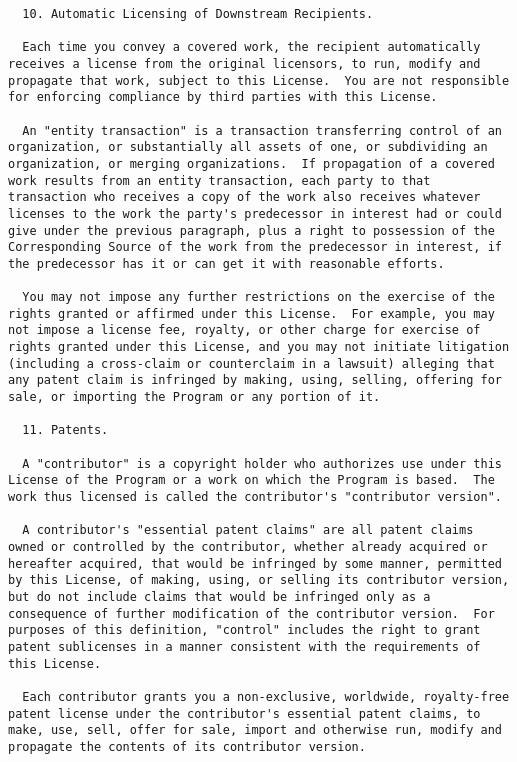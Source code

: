 \documentclass[11pt]{article}
\begin{document}
\begin{verbatim}
  10. Automatic Licensing of Downstream Recipients.

  Each time you convey a covered work, the recipient automatically
receives a license from the original licensors, to run, modify and
propagate that work, subject to this License.  You are not responsible
for enforcing compliance by third parties with this License.

  An "entity transaction" is a transaction transferring control of an
organization, or substantially all assets of one, or subdividing an
organization, or merging organizations.  If propagation of a covered
work results from an entity transaction, each party to that
transaction who receives a copy of the work also receives whatever
licenses to the work the party's predecessor in interest had or could
give under the previous paragraph, plus a right to possession of the
Corresponding Source of the work from the predecessor in interest, if
the predecessor has it or can get it with reasonable efforts.

  You may not impose any further restrictions on the exercise of the
rights granted or affirmed under this License.  For example, you may
not impose a license fee, royalty, or other charge for exercise of
rights granted under this License, and you may not initiate litigation
(including a cross-claim or counterclaim in a lawsuit) alleging that
any patent claim is infringed by making, using, selling, offering for
sale, or importing the Program or any portion of it.

  11. Patents.

  A "contributor" is a copyright holder who authorizes use under this
License of the Program or a work on which the Program is based.  The
work thus licensed is called the contributor's "contributor version".

  A contributor's "essential patent claims" are all patent claims
owned or controlled by the contributor, whether already acquired or
hereafter acquired, that would be infringed by some manner, permitted
by this License, of making, using, or selling its contributor version,
but do not include claims that would be infringed only as a
consequence of further modification of the contributor version.  For
purposes of this definition, "control" includes the right to grant
patent sublicenses in a manner consistent with the requirements of
this License.

  Each contributor grants you a non-exclusive, worldwide, royalty-free
patent license under the contributor's essential patent claims, to
make, use, sell, offer for sale, import and otherwise run, modify and
propagate the contents of its contributor version.


\end{verbatim}
\end{document}

